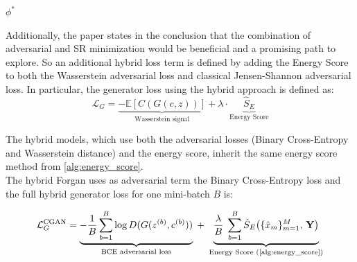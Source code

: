 \begin{algorithm}[H]
\begin{algorithmic}[1]
\ENDFOR

\RETURN $\phi^*$
\end{algorithmic}
\end{algorithm}





 
\newcommand{\Loss}{\mathcal{L}}
\newcommand{\ES}{\hat{S}_{E}}
 
\newcommand{\LINECOMMENT}[1]{%
  \STATE{\color{commentgray}\small$\triangleright$\;\textit{#1}}}
 
\renewcommand{\algorithmiccomment}[1]{%
  \hfill{\color{commentgray}\small$\triangleright$\;\textit{#1}}}
 

Additionally, the paper states in the conclusion that the combination of adversarial and SR minimization would be beneficial and a promising path to explore. So an additional hybrid loss term is defined by adding the Energy Score to both the Wasserstein adversarial loss and classical Jensen-Shannon adversarial loss. 
In particular, the generator loss using the hybrid approach is defined as:
\begin{equation}
    \label{eq:hybrid_wasserstein_loss}
    \mathcal{L}_G = \underbrace{-\mathbb{E}[C(G(c,z))]}_{\text{Wasserstein signal}} + \lambda \cdot \underbrace{\hat{S}_E}_{\text{Energy Score}}
\end{equation}


 
The hybrid models, which use both the adversarial losses (Binary Cross-Entropy and Wasserstein distance) and the energy score, inherit the same energy score method from \ref{alg:energy_score}.\\
The hybrid Forgan uses as adversarial term the Binary Cross-Entropy loss and the
 full hybrid generator loss for one mini-batch $B$ is:
 
\begin{equation}
  \Loss_{G}^{\mathrm{CGAN}}
  =
  \underbrace{
    -\frac{1}{B} \sum_{b=1}^B \log D(G(z^{(b)}, c^{(b)}))
  }_{\text{BCE adversarial loss}}
  \;+\;
  \underbrace{
    \frac{\lambda}{B}\;
    \sum_{b=1}^B \ES\!\left(\{\hat{x}_m\}_{m=1}^{M},\,\mathbf{Y}\right)
  }_{\text{Energy Score (\ref{alg:energy_score})}}
  \label{eq:cgan_hybrid}
\end{equation}
 
